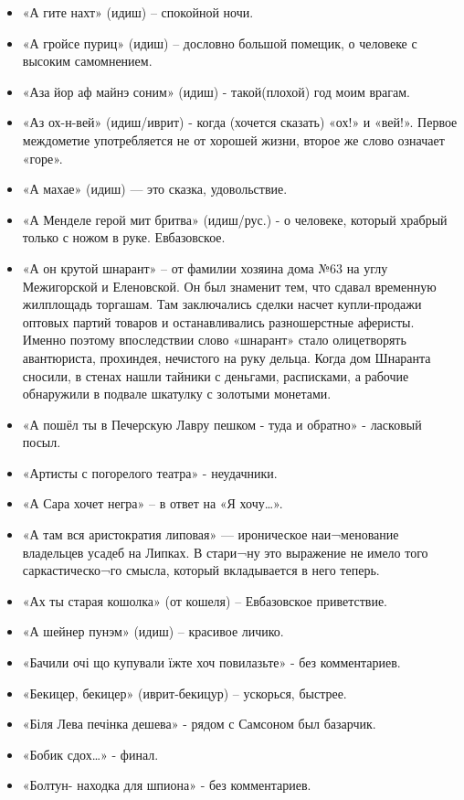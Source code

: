 \begin{itemize}
\item  «А гите нахт» (идиш) – спокойной ночи.
\item  «А гройсе пуриц» (идиш) – дословно большой помещик, о человеке с высоким самомнением.
\item  «Аза йор аф майнэ соним» (идиш) - такой(плохой) год моим врагам.
\item  «Аз ох-н-вей» (идиш/иврит) - когда (хочется сказать) «ох!» и «вей!». Первое междометие употребляется не от хорошей жизни, второе же слово означает «горе». 
\item  «А махае» (идиш) — это сказка, удовольствие.
\item  «А Менделе герой мит бритва» (идиш/рус.) - о человеке, который храбрый только с ножом в руке. Евбазовское.
\item  «А он крутой шнарант» – от фамилии хозяина дома №63 на углу Межигорской и Еленовской. Он был знаменит тем, что сдавал временную жилплощадь торгашам. Там заключались сделки насчет купли-продажи оптовых партий товаров и останавливались разношерстные аферисты. Именно поэтому впоследствии слово «шнарант» стало олицетворять авантюриста, прохиндея, нечистого на руку дельца. Когда дом Шнаранта сносили, в стенах нашли тайники с деньгами, расписками, а рабочие обнаружили в подвале шкатулку с золотыми монетами.
\item  «А пошёл ты в Печерскую Лавру пешком - туда и обратно» - ласковый посыл.
\item  «Артисты с погорелого театра» - неудачники.
\item  «А Сара хочет негра» – в ответ на «Я хочу…».
\item  «А там вся аристократия липовая» — ироническое наи¬менование владельцев усадеб на Липках. В стари¬ну это выражение не имело того саркастическо¬го смысла, который вкладывается в него теперь.
\item  «Ах ты старая кошолка» (от кошеля) – Евбазовское приветствие.
\item  «А шейнер пунэм» (идиш) – красивое личико.
\item  «Бачили очі що купували їжте хоч повилазьте» - без комментариев.
\item  «Бекицер, бекицер» (иврит-бекицур) – ускорься, быстрее.
\item  «Біля Лева печінка дешева» - рядом с Самсоном был базарчик.
\item  «Бобик сдох…» - финал.
\item  «Болтун- находка для шпиона» - без комментариев.

\end{itemize}
